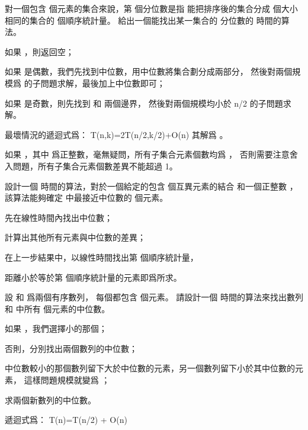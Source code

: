 \startEXERCISE
對一個包含  個元素的集合來說，第  個{\EMP 分位數}是指
能把排序後的集合分成  個大小相同的集合的  個順序統計量。
給出一個能找出某一集合的  分位數的  時間的算法。
\stopEXERCISE

\startANSWER
\startigNum
\item 如果 ，則返回空；
\item 如果  是偶數，我們先找到中位數，用中位數將集合劃分成兩部分，
然後對兩個規模爲  的子問題求解，最後加上中位數即可；
\item 如果  是奇數，則先找到  和  兩個邊界，
然後對兩個規模均小於 n/2 的子問題求解。
\stopigNum

最壞情況的遞迴式爲：
\startformula
T(n,k)=2T(\left\lfloor n/2\right\rfloor,k/2)+O(n)
\stopformula
其解爲 。

如果 ，其中  爲正整數，毫無疑問，所有子集合元素個數均爲 ，
否則需要注意舍入問題，所有子集合元素個數差異不能超過 1。
\stopANSWER

\startEXERCISE
設計一個  時間的算法，對於一個給定的包含  個互異元素的結合  和一個正整數 ，
該算法能夠確定  中最接近中位數的  個元素。
\stopEXERCISE

\startANSWER
\startigNum
\item 先在線性時間內找出中位數；
\item 計算出其他所有元素與中位數的差異；
\item 在上一步結果中，以線性時間找出第  個順序統計量，
\item 距離小於等於第  個順序統計量的元素即爲所求。
\stopigNum
\stopANSWER

\startEXERCISE[exercise:9.3-8]
設  和  爲兩個有序數列，
每個都包含  個元素。
請設計一個  時間的算法來找出數列  和  中所有  個元素的中位數。
\stopEXERCISE

\startANSWER
\startigNum
\item 如果 ，我們選擇小的那個；
\item 否則，分別找出兩個數列的中位數；
\item 中位數較小的那個數列留下大於中位數的元素，另一個數列留下小於其中位數的元素，
這樣問題規模就變爲 ；
\item 求兩個新數列的中位數。
\stopigNum

遞迴式爲：
\startformula
T(n)=T(n/2) + O(n)
\stopformula
\stopANSWER

